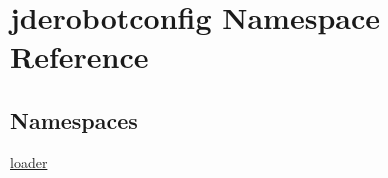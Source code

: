 \hypertarget{namespacejderobotconfig}{}\section{jderobotconfig Namespace Reference}
\label{namespacejderobotconfig}
\subsection*{Namespaces}
\begin{DoxyCompactItemize}
\item 
 \hyperlink{namespacejderobotconfig_1_1loader}{loader}
\end{DoxyCompactItemize}
